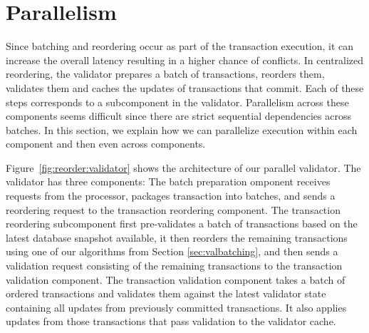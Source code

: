 

\section{Parallelism}
\label{sec:parallel}
\label{subsec:validator_reordering:parallel}
Since batching and reordering occur as part of the transaction execution, it can increase the overall latency 
resulting in a higher chance of conflicts. 
In centralized reordering, the validator prepares a batch of transactions, reorders them,  validates them and caches the updates of transactions that commit. Each of these steps corresponds to a subcomponent in the validator. Parallelism across these components seems difficult since there are strict sequential dependencies across batches. In this section, we explain how we can parallelize execution within each component and then even across components.

Figure~\ref{fig:reorder:validator} shows the architecture of our parallel validator. The validator has three components: 
The batch preparation omponent receives requests from the processor, packages transaction into batches, and sends a reordering request to the transaction reordering component. The transaction reordering subcomponent first pre-validates a batch of transactions based on the latest database snapshot available, it then reorders the remaining transactions using one of our algorithms from Section \ref{sec:valbatching}, and then sends a validation request consisting of the remaining transactions to the transaction validation component. 
The transaction validation component takes a batch of ordered 
transactions
and validates them against the latest validator state containing all updates from previously committed transactions. It also applies updates from those transactions that pass validation to the validator cache.

